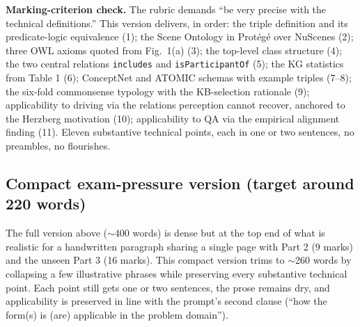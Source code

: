 \documentclass[11pt, a4paper]{article}
\begin{document}
\textbf{Marking-criterion check.} The rubric demands ``be very precise with the technical definitions.'' This version delivers, in order: the triple definition and its predicate-logic equivalence (1); the Scene Ontology in Protégé over NuScenes (2); three OWL axioms quoted from Fig.\ 1(a) (3); the top-level class structure (4); the two central relations \texttt{includes} and \texttt{isParticipantOf} (5); the KG statistics from Table 1 (6); ConceptNet and ATOMIC schemas with example triples (7--8); the six-fold commonsense typology with the KB-selection rationale (9); applicability to driving via the relations perception cannot recover, anchored to the Herzberg motivation (10); applicability to QA via the empirical alignment finding (11). Eleven substantive technical points, each in one or two sentences, no preambles, no flourishes.

\subsection{Compact exam-pressure version (target around 220 words)}

\begin{notebox}
The full version above ($\sim$400 words) is dense but at the top end of what is realistic for a handwritten paragraph sharing a single page with Part 2 (9 marks) and the unseen Part 3 (16 marks). This compact version trims to $\sim$260 words by collapsing a few illustrative phrases while preserving every substantive technical point. Each point still gets one or two sentences, the prose remains dry, and applicability is preserved in line with the prompt's second clause (``how the form(s) is (are) applicable in the problem domain'').
\end{notebox}
\end{document}
